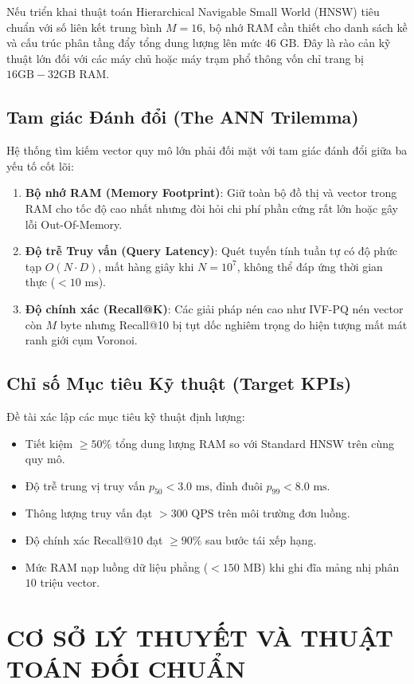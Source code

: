 \documentclass[12pt,a4paper]{article}
\begin{document}
Nếu triển khai thuật toán Hierarchical Navigable Small World (HNSW) tiêu chuẩn với số liên kết trung bình $M = 16$, bộ nhớ RAM cần thiết cho danh sách kề và cấu trúc phân tầng đẩy tổng dung lượng lên mức $46\text{ GB}$. Đây là rào cản kỹ thuật lớn đối với các máy chủ hoặc máy trạm phổ thông vốn chỉ trang bị $16\text{GB} - 32\text{GB}$ RAM.

\subsection{Tam giác Đánh đổi (The ANN Trilemma)}
Hệ thống tìm kiếm vector quy mô lớn phải đối mặt với tam giác đánh đổi giữa ba yếu tố cốt lõi:
\begin{enumerate}
  \item \textbf{Bộ nhớ RAM (Memory Footprint)}: Giữ toàn bộ đồ thị và vector trong RAM cho tốc độ cao nhất nhưng đòi hỏi chi phí phần cứng rất lớn hoặc gây lỗi Out-Of-Memory.
  \item \textbf{Độ trễ Truy vấn (Query Latency)}: Quét tuyến tính tuần tự có độ phức tạp $O(N \cdot D)$, mất hàng giây khi $N = 10^7$, không thể đáp ứng thời gian thực ($< 10\text{ ms}$).
  \item \textbf{Độ chính xác (Recall@K)}: Các giải pháp nén cao như IVF-PQ nén vector còn $M$ byte nhưng Recall@10 bị tụt dốc nghiêm trọng do hiện tượng mất mát ranh giới cụm Voronoi.
\end{enumerate}

\subsection{Chỉ số Mục tiêu Kỹ thuật (Target KPIs)}
Đề tài xác lập các mục tiêu kỹ thuật định lượng:
\begin{itemize}
  \item Tiết kiệm $\ge 50\%$ tổng dung lượng RAM so với Standard HNSW trên cùng quy mô.
  \item Độ trễ trung vị truy vấn $p_{50} < 3.0\text{ ms}$, đỉnh đuôi $p_{99} < 8.0\text{ ms}$.
  \item Thông lượng truy vấn đạt $> 300\text{ QPS}$ trên môi trường đơn luồng.
  \item Độ chính xác Recall@10 đạt $\ge 90\%$ sau bước tái xếp hạng.
  \item Mức RAM nạp luồng dữ liệu phẳng ($< 150\text{ MB}$) khi ghi đĩa mảng nhị phân $10$ triệu vector.
\end{itemize}

\section{CƠ SỞ LÝ THUYẾT VÀ THUẬT TOÁN ĐỐI CHUẨN}
\end{document}
